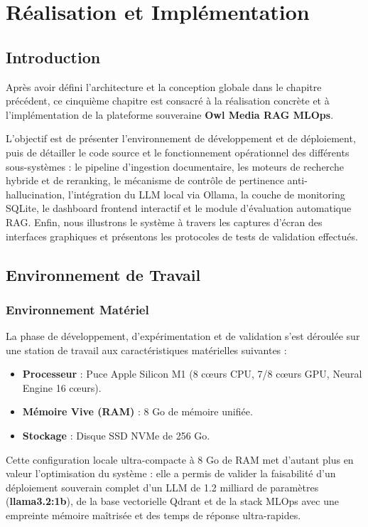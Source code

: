 \chapter{Réalisation et Implémentation}
\label{chap:realisation}

\section{Introduction}
Après avoir défini l'architecture et la conception globale dans le chapitre précédent, ce cinquième chapitre est consacré à la réalisation concrète et à l'implémentation de la plateforme souveraine \textbf{Owl Media RAG MLOps}. 

L'objectif est de présenter l'environnement de développement et de déploiement, puis de détailler le code source et le fonctionnement opérationnel des différents sous-systèmes : le pipeline d'ingestion documentaire, les moteurs de recherche hybride et de reranking, le mécanisme de contrôle de pertinence anti-hallucination, l'intégration du LLM local via Ollama, la couche de monitoring SQLite, le dashboard frontend interactif et le module d'évaluation automatique RAG. Enfin, nous illustrons le système à travers les captures d'écran des interfaces graphiques et présentons les protocoles de tests de validation effectués.

\section{Environnement de Travail}

\subsection{Environnement Matériel}
La phase de développement, d'expérimentation et de validation s'est déroulée sur une station de travail aux caractéristiques matérielles suivantes :
\begin{itemize}
    \item \textbf{Processeur} : Puce Apple Silicon M1 (8 cœurs CPU, 7/8 cœurs GPU, Neural Engine 16 cœurs).
    \item \textbf{Mémoire Vive (RAM)} : 8 Go de mémoire unifiée.
    \item \textbf{Stockage} : Disque SSD NVMe de 256 Go.
\end{itemize}

Cette configuration locale ultra-compacte à 8 Go de RAM met d'autant plus en valeur l'optimisation du système : elle a permis de valider la faisabilité d'un déploiement souverain complet d'un LLM de 1.2 milliard de paramètres (\textbf{llama3.2:1b}), de la base vectorielle Qdrant et de la stack MLOps avec une empreinte mémoire maîtrisée et des temps de réponse ultra-rapides.

